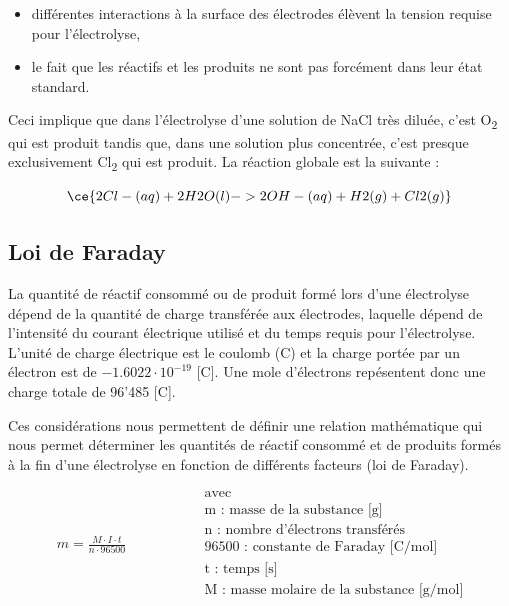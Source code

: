 \documentclass[
  11pt,
  a4paper,
  openany]{book}
\providecommand{\tightlist}{%
  \setlength{\itemsep}{0pt}\setlength{\parskip}{0pt}}
\begin{document}
\begin{itemize}
\tightlist
\item
  différentes interactions à la surface des électrodes élèvent la tension requise pour l'électrolyse,
\item
  le fait que les réactifs et les produits ne sont pas forcément dans leur état standard.
\end{itemize}

Ceci implique que dans l'électrolyse d'une solution de NaCl très diluée, c'est O\textsubscript{2} qui est produit tandis que, dans une solution plus concentrée, c'est presque exclusivement Cl\textsubscript{2} qui est produit. La réaction globale est la suivante :

\[
\ce{2 Cl-(aq) + 2 H2O(l) -> 2 OH-(aq) + H2(g) + Cl2(g)}
\]

\clearpage

\subsection{Loi de Faraday}\label{loi-de-faraday}

La quantité de réactif consommé ou de produit formé lors d'une électrolyse dépend de la quantité de charge transférée aux électrodes, laquelle dépend de l'intensité du courant électrique utilisé et du temps requis pour l'électrolyse. L'unité de charge électrique est le coulomb (C) et la charge portée par un électron est de \(-1.6022 \cdot 10^{-19}\) {[}C{]}. Une mole d'électrons repésentent donc une charge totale de 96'485 {[}C{]}.

Ces considérations nous permettent de définir une relation mathématique qui nous permet déterminer les quantités de réactif consommé et de produits formés à la fin d'une électrolyse en fonction de différents facteurs (loi de Faraday).

\[
\begin{split}
m = \frac{M \cdot I \cdot t}{n \cdot 96500}
\end{split}
\qquad\qquad
\begin{split}
&\text{avec} \\
&\text{m : masse de la substance [g]} \\
&\text{n : nombre d'électrons transférés} \\
&\text{96500 : constante de Faraday [C/mol]} \\
&\text{t : temps [s]} \\
&\text{M : masse molaire de la substance [g/mol]}
\end{split}
\]
\end{document}
